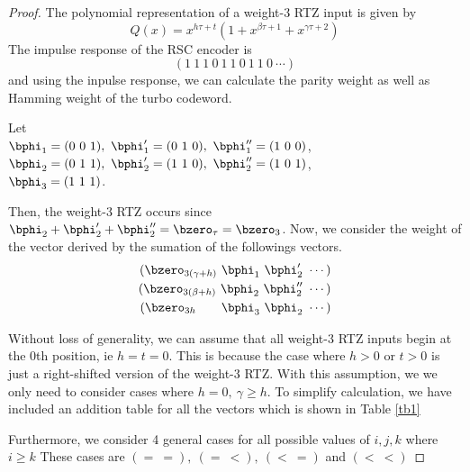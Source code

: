 \documentclass[11pt, oneside, dvipdfmx]{book}
\begin{document}
\begin{proof}
The polynomial representation of a weight-$3$ RTZ input is given by $$Q(x) =x^{h\tau+t}(1+x^{\beta \tau +1}+x^{\gamma \tau +2})$$
The impulse response of the RSC encoder is
\[
(1~1~1~0~1~1~0~1~1~0~\cdots)
\]
and using the inpulse response, we can calculate the parity weight as well as Hamming weight of the turbo codeword. 

Let \\$\bphi_1=(0~0~1),~\bphi'_1=(0~1~0),~\bphi''_1=(1~0~0)$, \\
$\bphi_2=(0~1~1),~\bphi'_2=(1~1~0),~\bphi''_2=(1~0~1)$, \\
$\bphi_3=(1~1~1)$. 

Then, the weight-3 RTZ occurs since $\bphi_2+\bphi'_2+\bphi''_2=\bzero_{\tau}=\bzero_3$. 
Now, we consider the weight of the vector derived by the sumation of the followings vectors.
\begin{eqnarray*}
(\bzero_{3(\gamma+h)}~\bphi_1~\bphi'_2~\cdots)\cr
(\bzero_{3(\beta+h)}~\bphi_2~\bphi''_2~\cdots)\cr
(\bzero_{3 h}~~~~~~\bphi_3~\bphi_2~\cdots)
\end{eqnarray*}

Without loss of generality, we can assume that all weight-$3$ RTZ inputs begin at the $0$th position, ie $h=t=0$. This is because the case where $h>0$ or $t>0$ is just a right-shifted version of the weight-$3$ RTZ. With this assumption, we we only need to consider cases where $h= 0,~\gamma \geq h$.
To simplify calculation, we have included an addition table for all the vectors which is shown in Table \ref{tb1}

\begin{table}[h!]
\centering
{}
\caption{Truth Table}
\label{tb1}
\end{table}
Furthermore, we consider 4 general cases for all possible values of $i,j,k$ where $i \geq k$ These cases are $(=~=),~(=~<),~(<~=)$ and $(<~<)$

\end{proof}
\end{document}
